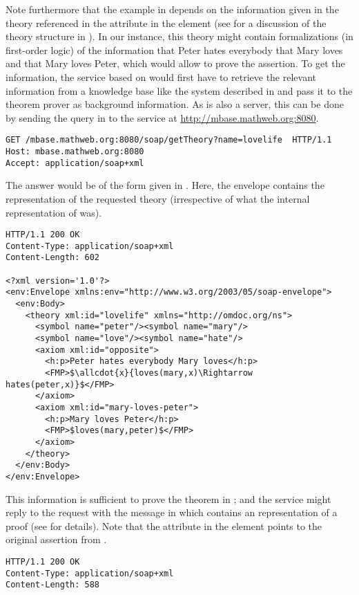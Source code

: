 \begin{omgroup}[id=rpc,short=Communication between Systems]
Note furthermore that the example in {} depends on the information
given in the theory {} referenced in the {}
attribute in the {} element (see {} for a
discussion of the theory structure in {\omdoc}). In our instance, this theory might
contain formalizations (in first-order logic) of the information that Peter hates
everybody that Mary loves and that Mary loves Peter, which would allow {\spass} to prove
the assertion. To get the information, the {\mathwebws} service based on {\spass} would
first have to retrieve the relevant information from a knowledge base like the {\mbase}
system described in {} and pass it to the {\spass} theorem prover
as background information. As {\mbase} is also a {\mathwebws} server, this can be done by
sending the query in {} to the {\mbase} service at
\url{http://mbase.mathweb.org:8080}.

\begin{lstlisting}[label=lst:rpc-getTheory,  
  caption={Requesting a Theory from {\mbase}}]
GET /mbase.mathweb.org:8080/soap/getTheory?name=lovelife  HTTP/1.1
Host: mbase.mathweb.org:8080
Accept: application/soap+xml
\end{lstlisting}
The answer would be of the form given in {}. Here, the
{\soap} envelope contains the {\omdoc} representation of the requested theory
(irrespective of what the internal representation of {\mbase} was).
\begin{lstlisting}[label=lst:rpc-theory,mathescape,
  caption={The Background Theory for Message {\ref{lst:rpc-prover}}}]
HTTP/1.1 200 OK
Content-Type: application/soap+xml
Content-Length: 602

<?xml version='1.0'?>
<env:Envelope xmlns:env="http://www.w3.org/2003/05/soap-envelope">
  <env:Body>
    <theory xml:id="lovelife" xmlns="http://omdoc.org/ns"> 
      <symbol name="peter"/><symbol name="mary"/> 
      <symbol name="love"/><symbol name="hate"/> 
      <axiom xml:id="opposite"> 
        <h:p>Peter hates everybody Mary loves</h:p> 
        <FMP>$\allcdot{x}{loves(mary,x)\Rightarrow hates(peter,x)}$</FMP> 
      </axiom> 
      <axiom xml:id="mary-loves-peter"> 
        <h:p>Mary loves Peter</h:p> 
        <FMP>$loves(mary,peter)$</FMP>
      </axiom>
    </theory>
  </env:Body>
</env:Envelope>
\end{lstlisting}
This information is sufficient to prove the theorem in {}; and the
{\spass} service might reply to the request with the message in {}
which contains an {\omdoc} representation of a proof (see {} for
details). Note that the {} attribute in the {}
element points to the original assertion from {}.
\begin{lstlisting}[label=lst:rpc-proof,mathescape,
  caption={A proof that Peter hates someone}]
HTTP/1.1 200 OK
Content-Type: application/soap+xml
Content-Length: 588


\end{lstlisting}
\end{omgroup}
